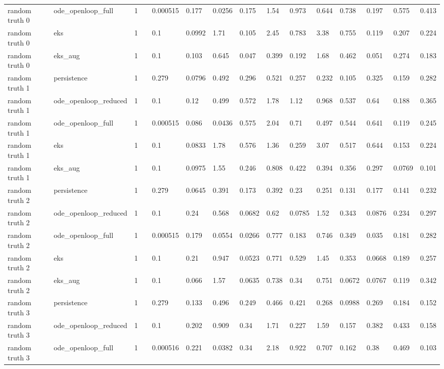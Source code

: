 \begin{table}[t]
\begin{tabular}{lllllllllllllll}
random truth 0 & ode\_openloop\_full & 1 &  & 0.000515 & 0.177 & 0.0256 & 0.175 & 1.54 & 0.973 & 0.644 & 0.738 & 0.197 & 0.575 & 0.413 \\
random truth 0 & eks & 1 &  & 0.1 & 0.0992 & 1.71 & 0.105 & 2.45 & 0.783 & 3.38 & 0.755 & 0.119 & 0.207 & 0.224 \\
random truth 0 & eks\_aug & 1 &  & 0.1 & 0.103 & 0.645 & 0.047 & 0.399 & 0.192 & 1.68 & 0.462 & 0.051 & 0.274 & 0.183 \\
random truth 1 & persistence & 1 &  & 0.279 & 0.0796 & 0.492 & 0.296 & 0.521 & 0.257 & 0.232 & 0.105 & 0.325 & 0.159 & 0.282 \\
random truth 1 & ode\_openloop\_reduced & 1 &  & 0.1 & 0.12 & 0.499 & 0.572 & 1.78 & 1.12 & 0.968 & 0.537 & 0.64 & 0.188 & 0.365 \\
random truth 1 & ode\_openloop\_full & 1 &  & 0.000515 & 0.086 & 0.0436 & 0.575 & 2.04 & 0.71 & 0.497 & 0.544 & 0.641 & 0.119 & 0.245 \\
random truth 1 & eks & 1 &  & 0.1 & 0.0833 & 1.78 & 0.576 & 1.36 & 0.259 & 3.07 & 0.517 & 0.644 & 0.153 & 0.224 \\
random truth 1 & eks\_aug & 1 &  & 0.1 & 0.0975 & 1.55 & 0.246 & 0.808 & 0.422 & 0.394 & 0.356 & 0.297 & 0.0769 & 0.101 \\
random truth 2 & persistence & 1 &  & 0.279 & 0.0645 & 0.391 & 0.173 & 0.392 & 0.23 & 0.251 & 0.131 & 0.177 & 0.141 & 0.232 \\
random truth 2 & ode\_openloop\_reduced & 1 &  & 0.1 & 0.24 & 0.568 & 0.0682 & 0.62 & 0.0785 & 1.52 & 0.343 & 0.0876 & 0.234 & 0.297 \\
random truth 2 & ode\_openloop\_full & 1 &  & 0.000515 & 0.179 & 0.0554 & 0.0266 & 0.777 & 0.183 & 0.746 & 0.349 & 0.035 & 0.181 & 0.282 \\
random truth 2 & eks & 1 &  & 0.1 & 0.21 & 0.947 & 0.0523 & 0.771 & 0.529 & 1.45 & 0.353 & 0.0668 & 0.189 & 0.257 \\
random truth 2 & eks\_aug & 1 &  & 0.1 & 0.066 & 1.57 & 0.0635 & 0.738 & 0.34 & 0.751 & 0.0672 & 0.0767 & 0.119 & 0.342 \\
random truth 3 & persistence & 1 &  & 0.279 & 0.133 & 0.496 & 0.249 & 0.466 & 0.421 & 0.268 & 0.0988 & 0.269 & 0.184 & 0.152 \\
random truth 3 & ode\_openloop\_reduced & 1 &  & 0.1 & 0.202 & 0.909 & 0.34 & 1.71 & 0.227 & 1.59 & 0.157 & 0.382 & 0.433 & 0.158 \\
random truth 3 & ode\_openloop\_full & 1 &  & 0.000516 & 0.221 & 0.0382 & 0.34 & 2.18 & 0.922 & 0.707 & 0.162 & 0.38 & 0.469 & 0.103 \\

\end{tabular}
\end{table}
